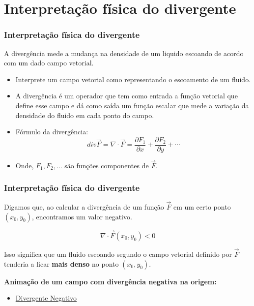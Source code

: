 \section{Interpretação física do divergente}
\begin{frame}
    \frametitle{Interpretação física do divergente}
    A divergência mede a mudança na densidade de um liquido escoando de acordo com um dado campo vetorial.
    
    \begin{itemize}
        \item Interprete um campo vetorial como representando o escoamento de um fluido.
        \item A divergência é um operador que tem como entrada a função vetorial que define esse campo e dá como saída um função escalar que mede a variação da densidade do fluido em cada ponto do campo.
        \item Fórmulo da divergência:
              \begin{equation*}
                  div \vec{F} = \nabla \cdot \vec{F} = \dfrac{\partial F_1}{\partial x}+\dfrac{\partial F_2}{\partial y}+ \cdots
              \end{equation*}
        \item Onde, $F_1, F_2, \ldots$ são funções componentes de $\vec{F}$.
    \end{itemize}
\end{frame}

\begin{frame}
    \frametitle{Interpretação física do divergente}
    Digamos que, ao calcular a divergência de um função $\vec{F}$ em um certo ponto $(x_0,y_0)$, encontramos um valor negativo.
    \vspace{2mm}
    
    \begin{equation*}
        \nabla \cdot \vec{F}(x_0,y_0) < 0
    \end{equation*}
    \vspace{2mm}
    
    Isso significa que um fluido escoando segundo o campo vetorial definido por $\vec{F}$ tenderia a ficar \textbf{mais denso} no ponto $(x_0,y_0)$.
    \vspace{5mm}
    
    \textbf{Animação de um campo com divergência negativa na origem:}
    \begin{itemize}
        \item \href{https://www.youtube.com/watch?v=rqnTQyO4GY4}{Divergente Negativo}
    \end{itemize}
    
\end{frame}


